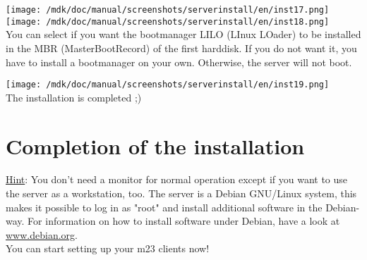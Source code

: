 \texttt{[image: /mdk/doc/manual/screenshots/serverinstall/en/inst17.png]}
\\



\texttt{[image: /mdk/doc/manual/screenshots/serverinstall/en/inst18.png]}
\\
You can select if you want the bootmanager LILO (LInux LOader) to be installed in the MBR (MasterBootRecord) of the first harddisk. If you do not want it, you have to install a bootmanager on your own. Otherwise, the server will not boot.



\texttt{[image: /mdk/doc/manual/screenshots/serverinstall/en/inst19.png]}
\\
The installation is completed ;)

\section{Completion of the installation}
\underline{Hint}: You don't need a monitor for normal operation except if you want to use the server as a workstation, too. The server is a Debian GNU/Linux system, this makes it possible to log in as "root" and install additional software in the Debian-way. For information on how to install software under Debian, have a look at \url{www.debian.org}.\\
You can start setting up your m23 clients now!